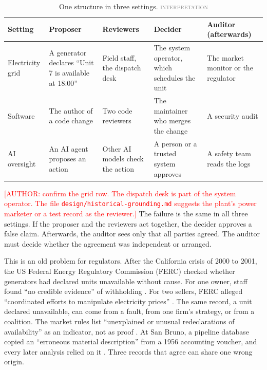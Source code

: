 \documentclass[11pt]{article}
\newcommand{\todonote}[1]{\textcolor{red}{\small [#1]}}
\newcommand{\statustag}[1]{\textcolor{gray}{{\small\mdseries\textsc{#1}}}}
\begin{document}
\begin{table}[H]
\centering
\small
\caption{One structure in three settings. \statustag{interpretation}}
\label{tab:1}
\begin{tabularx}{\textwidth}{>{\hsize=0.582\hsize\raggedright\arraybackslash}X>{\hsize=1.382\hsize\raggedright\arraybackslash}X>{\hsize=0.867\hsize\raggedright\arraybackslash}X>{\hsize=1.220\hsize\raggedright\arraybackslash}X>{\hsize=0.949\hsize\raggedright\arraybackslash}X}
\toprule
Setting & Proposer & Reviewers & Decider & Auditor (afterwards) \\
\midrule
Electricity grid & A generator declares ``Unit 7 is available at 18:00'' & Field staff, the dispatch desk & The system operator, which schedules the unit & The market monitor or the regulator \\
Software & The author of a code change & Two code reviewers & The maintainer who merges the change & A security audit \\
AI oversight & An AI agent proposes an action & Other AI models check the action & A person or a trusted system approves & A safety team reads the logs \\
\bottomrule
\end{tabularx}
\end{table}

\todonote{AUTHOR: confirm the grid row. The dispatch desk is part of the system operator. The file \texttt{design/\allowbreak{}historical-{}\allowbreak{}grounding.\allowbreak{}md} suggests the plant's power marketer or a test record as the reviewer.} The failure is the same in all three settings. If the proposer and the reviewers act together, the decider approves a false claim. Afterwards, the auditor sees only that all parties agreed. The auditor must decide whether the agreement was independent or arranged.

This is an old problem for regulators. After the California crisis of 2000 to 2001, the US Federal Energy Regulatory Commission (FERC) checked whether generators had declared units unavailable without cause. For one owner, staff found ``no credible evidence'' of withholding \citep{S28}. For two sellers, FERC alleged ``coordinated efforts to manipulate electricity prices'' \citep{S29}. The same record, a unit declared unavailable, can come from a fault, from one firm's strategy, or from a coalition. The market rules list ``unexplained or unusual redeclarations of availability'' as an indicator, not as proof \citep{S30}. At San Bruno, a pipeline database copied an ``erroneous material description'' from a 1956 accounting voucher, and every later analysis relied on it \citep{S34}. Three records that agree can share one wrong origin.
\end{document}

